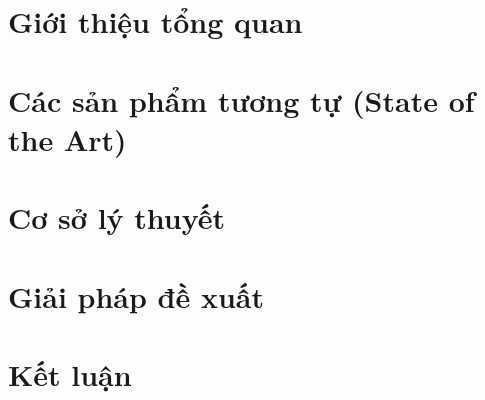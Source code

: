 \documentclass[12pt]{report}
\begin{document}

\setmainfont{Times New Roman}

\clearpage
{} 
%







%





\listoftables
\newpage

\listoffigures
\newpage


\chapter{Giới thiệu tổng quan}
\label{chapter: intro}









\chapter{Các sản phẩm tương tự (State of the Art)}
\label{chapter:related}



\chapter{Cơ sở lý thuyết}
\label{chapter:background}



\chapter{Giải pháp đề xuất}
\label{chapter:solution}


\chapter{Kết luận}
\label{chapter:conclusion}





\appendix



\end{document}
